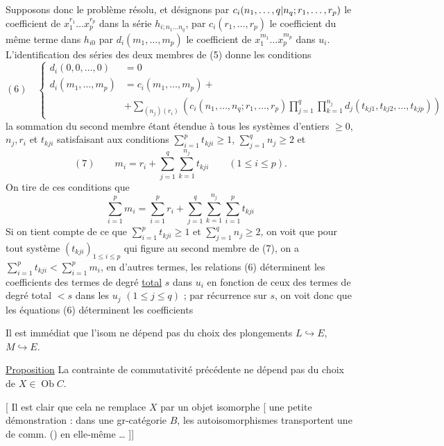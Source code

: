 Supposons donc le problème résolu, et désignons par
$c_i(n_1,\ldots,q|n_q;r_1,\ldots,r_p)$ le coefficient de
$x_1^{r_1}\ldots x_p^{r_p}$ dans la série $h_{i;n_1\ldots n_q}$,
par $c_i(r_1,\ldots,r_p)$ le coefficient du même terme dans $h_{i0}$
par $d_i(m_1,\ldots,m_p)$ le coefficient de $x_1^{m_1}\ldots x_p^{m_p}$
dans $u_i$. L'identification des séries des deux membres de (5) donne les conditions
\[
(6)\quad
\left\{\begin{aligned}
d_i(0,0,\ldots,0)&=0\\
d_i(m_1,\ldots,m_p)&=c_i(m_1,\ldots,m_p)+\\
&+\sum_{(n_j)(r_i)}
\left(c_i(n_1,\ldots,n_q;r_1,\ldots,r_p)
\prod_{j=1}^q\prod_{k=1}^{n_j}d_j(t_{kj1},t_{kj2},\ldots,t_{kjp})\right)
\end{aligned}\right.
\]
la sommation du second membre étant étendue à tous les systèmes d'entiers
$\geq0$, $n_j,r_i$ et $t_{kji}$ satisfaisant aux conditions
$\sum_{i=1}^p t_{kji}\geq1$, $\sum_{j=1}^q n_j\geq2$ et
\[
(7)\qquad
m_i=r_i+\sum_{j=1}^q\sum_{k=1}^{n_j}t_{kji}
\qquad(1\leq i\leq p).
\]
On tire de ces conditions que
\[
\sum_{i=1}^p m_i=\sum_{i=1}^p r_i+
\sum_{j=1}^q\sum_{k=1}^{n_j}\sum_{i=1}^p t_{kji}
\]
Si on tient compte de ce que $\sum_{i=1}^p t_{kji}\geq1$
et $\sum_{j=1}^q n_j\geq2$, on voit que pour tout système
$(t_{kji})_{1\leq i\leq p}$ qui figure au second membre de (7),
on a $\sum_{i=1}^p t_{kji}<\sum_{i=1}^p m_i$, en d'autres termes,
les relations (6) déterminent les coefficients des termes de degré
\uline{total} $s$ dans $u_i$ en fonction de ceux des termes de degré total
$<s$ dans les $u_j$ $(1\leq j\leq q)$ ; par récurrence sur $s$,
on voit donc que les équations (6) déterminent les coefficients


Il est immédiat que 
l'isom ne dépend pas du choix des plongements $L\hookrightarrow E$,
$M\hookrightarrow E$.

\uline{Proposition} La contrainte de commutativité précédente ne dépend
pas du choix de $X\in\operatorname{Ob}C$.

[
Il est clair que cela ne 
remplace $X$ par un objet isomorphe
[ une petite démonstration : dans une gr-catégorie
$B$, les  autoisomorphismes
 transportent une
de comm. () en elle-même \ldots
]]

